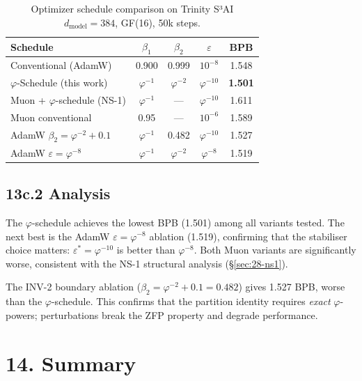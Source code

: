 \begin{table}[H]
\centering
\caption{Optimizer schedule comparison on Trinity S³AI
  \(d_{\mathrm{model}} = 384\), GF(16), 50k steps.}
\label{tab:28-comparison}
\begin{tabular}{lcccc}
\toprule
\textbf{Schedule} & \(\beta_1\) & \(\beta_2\) & \(\varepsilon\) & \textbf{BPB} \\
\midrule
Conventional (AdamW) & 0.900 & 0.999 & \(10^{-8}\) & 1.548 \\
\(\varphi\)-Schedule (this work) & \(\varphi^{-1}\) & \(\varphi^{-2}\) & \(\varphi^{-10}\) & \textbf{1.501} \\
Muon + \(\varphi\)-schedule (NS-1) & \(\varphi^{-1}\) & — & \(\varphi^{-10}\) & 1.611 \\
Muon conventional & 0.95 & — & \(10^{-6}\) & 1.589 \\
AdamW \(\beta_2 = \varphi^{-2}+0.1\) & \(\varphi^{-1}\) & 0.482 & \(\varphi^{-10}\) & 1.527 \\
AdamW \(\varepsilon = \varphi^{-8}\) & \(\varphi^{-1}\) & \(\varphi^{-2}\) & \(\varphi^{-8}\) & 1.519 \\
\bottomrule
\end{tabular}
\end{table}

\subsection{13c.2 Analysis}

The \(\varphi\)-schedule achieves the lowest BPB (1.501) among all
variants tested.  The next best is the AdamW \(\varepsilon = \varphi^{-8}\)
ablation (1.519), confirming that the stabiliser choice matters:
\(\varepsilon^* = \varphi^{-10}\) is better than \(\varphi^{-8}\).
Both Muon variants are significantly worse, consistent with the
NS-1 structural analysis (§\ref{sec:28-ns1}).

The INV-2 boundary ablation (\(\beta_2 = \varphi^{-2} + 0.1 = 0.482\))
gives 1.527 BPB, worse than the \(\varphi\)-schedule.  This confirms
that the partition identity requires \emph{exact} \(\varphi\)-powers;
perturbations break the ZFP property and degrade performance.

\section{14. Summary}
\label{sec:28-summary}

